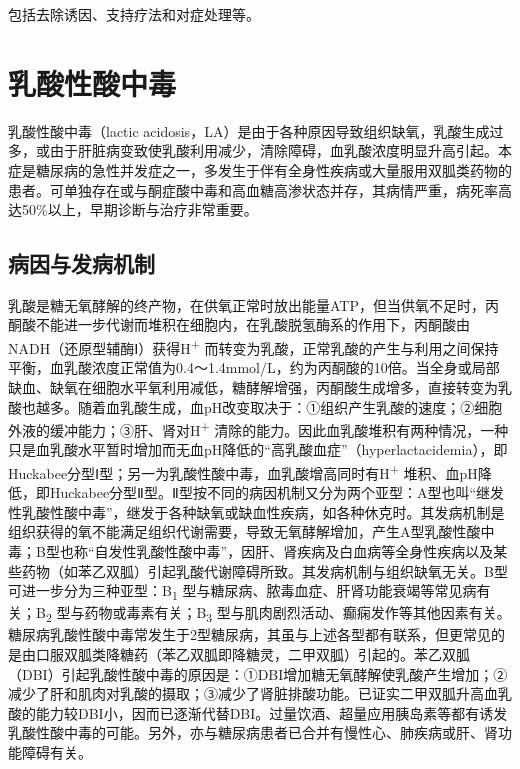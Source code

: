 包括去除诱因、支持疗法和对症处理等。

\protect\hypertarget{text00123.html}{}{}

\section{乳酸性酸中毒}

乳酸性酸中毒（lactic
acidosis，LA）是由于各种原因导致组织缺氧，乳酸生成过多，或由于肝脏病变致使乳酸利用减少，清除障碍，血乳酸浓度明显升高引起。本症是糖尿病的急性并发症之一，多发生于伴有全身性疾病或大量服用双胍类药物的患者。可单独存在或与酮症酸中毒和高血糖高渗状态并存，其病情严重，病死率高达50\%以上，早期诊断与治疗非常重要。

\subsection{病因与发病机制}

乳酸是糖无氧酵解的终产物，在供氧正常时放出能量ATP，但当供氧不足时，丙酮酸不能进一步代谢而堆积在细胞内，在乳酸脱氢酶系的作用下，丙酮酸由NADH（还原型辅酶Ⅰ）获得H\textsuperscript{+}
而转变为乳酸，正常乳酸的产生与利用之间保持平衡，血乳酸浓度正常值为0.4～1.4mmol/L，约为丙酮酸的10倍。当全身或局部缺血、缺氧在细胞水平氧利用减低，糖酵解增强，丙酮酸生成增多，直接转变为乳酸也越多。随着血乳酸生成，血pH改变取决于：①组织产生乳酸的速度；②细胞外液的缓冲能力；③肝、肾对H\textsuperscript{+}
清除的能力。因此血乳酸堆积有两种情况，一种只是血乳酸水平暂时增加而无血pH降低的“高乳酸血症”（hyperlactacidemia），即Huckabee分型Ⅰ型；另一为乳酸性酸中毒，血乳酸增高同时有H\textsuperscript{+}
堆积、血pH降低，即Huckabee分型Ⅱ型。Ⅱ型按不同的病因机制又分为两个亚型：A型也叫“继发性乳酸性酸中毒”，继发于各种缺氧或缺血性疾病，如各种休克时。其发病机制是组织获得的氧不能满足组织代谢需要，导致无氧酵解增加，产生A型乳酸性酸中毒；B型也称“自发性乳酸性酸中毒”，因肝、肾疾病及白血病等全身性疾病以及某些药物（如苯乙双胍）引起乳酸代谢障碍所致。其发病机制与组织缺氧无关。B型可进一步分为三种亚型：B\textsubscript{1}
型与糖尿病、脓毒血症、肝肾功能衰竭等常见病有关；B\textsubscript{2}
型与药物或毒素有关；B\textsubscript{3}
型与肌肉剧烈活动、癫痫发作等其他因素有关。糖尿病乳酸性酸中毒常发生于2型糖尿病，其虽与上述各型都有联系，但更常见的是由口服双胍类降糖药（苯乙双胍即降糖灵，二甲双胍）引起的。苯乙双胍（DBI）引起乳酸性酸中毒的原因是：①DBI增加糖无氧酵解使乳酸产生增加；②减少了肝和肌肉对乳酸的摄取；③减少了肾脏排酸功能。已证实二甲双胍升高血乳酸的能力较DBI小，因而已逐渐代替DBI。过量饮酒、超量应用胰岛素等都有诱发乳酸性酸中毒的可能。另外，亦与糖尿病患者已合并有慢性心、肺疾病或肝、肾功能障碍有关。


